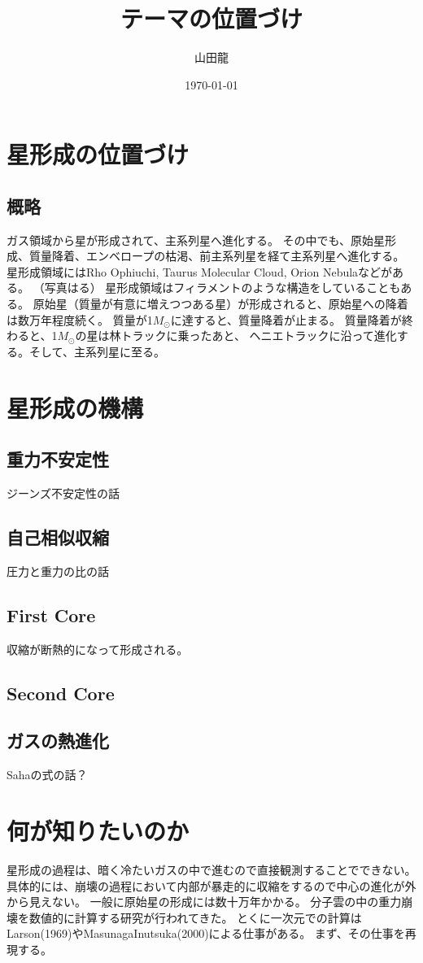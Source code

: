 \documentclass{jsarticle}
\date{\today}
\author{山田龍}
\title{テーマの位置づけ}
\begin{document}
\maketitle
\section{星形成の位置づけ}
\subsection{概略}
ガス領域から星が形成されて、主系列星へ進化する。
その中でも、原始星形成、質量降着、エンベロープの枯渇、前主系列星を経て主系列星へ進化する。
星形成領域にはRho Ophiuchi, Taurus Molecular Cloud, Orion Nebulaなどがある。
（写真はる）
星形成領域はフィラメントのような構造をしていることもある。
原始星（質量が有意に増えつつある星）が形成されると、原始星への降着は数万年程度続く。
質量が1$M_\odot$に達すると、質量降着が止まる。
質量降着が終わると、1$M_\odot$の星は林トラックに乗ったあと、
ヘニエトラックに沿って進化する。そして、主系列星に至る。
\section{星形成の機構}
\subsection{重力不安定性}
ジーンズ不安定性の話
\subsection{自己相似収縮}
圧力と重力の比の話
\subsection{First Core}
収縮が断熱的になって形成される。
\subsection{Second Core}
\subsection{ガスの熱進化}
Sahaの式の話？
\section{何が知りたいのか}
星形成の過程は、暗く冷たいガスの中で進むので直接観測することでできない。
具体的には、崩壊の過程において内部が暴走的に収縮をするので中心の進化が外から見えない。
一般に原始星の形成には数十万年かかる。
分子雲の中の重力崩壊を数値的に計算する研究が行われてきた。
とくに一次元での計算はLarson(1969)やMasunagaInutsuka(2000)による仕事がある。
まず、その仕事を再現する。
\end{document}
